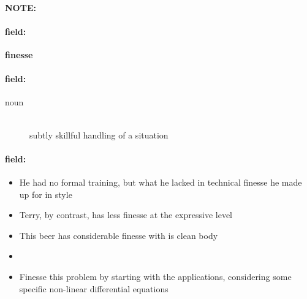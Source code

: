 \documentclass[12pt]{article}
\newenvironment{note}{\paragraph{NOTE:}}{}
\newenvironment{field}{\paragraph{field:}}{}
\begin{document}
\begin{note}
\begin{field}
\textbf{\large finesse}
\end{field}


\begin{field}
\begin{description}
\item[noun] \hfill \\ 
subtly skillful handling of a situation

\end{description}
\end{field}

\begin{field}
\begin{itemize}
\item He had no formal training, but what he lacked in technical finesse he made up for in style
\item Terry, by contrast, has less finesse at the expressive level
\item This beer has considerable finesse with is clean body
\item  
\item Finesse this problem by starting with the applications, considering some specific non-linear differential equations
\end{itemize}
\end{field}
\end{note}
\end{document}
